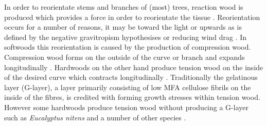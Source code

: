 In order to reorientate stems and branches of (most) trees, reaction wood is
produced which provides a force in order to reorientate the tissue \citep{gardiner2014biology}.
Reorientation occurs for a number of reasons, it may be toward the light or upwards as is defined by the
negative gravitropism hypothesises or reducing wind drag \citep{niklas2012plant, coutts1995wind}. In softwoods this
reorientation is caused by the production of compression wood. Compression wood
forms on the outside of the curve or branch and expands longitudinally \citep{timell1986compression}. Hardwoods
on the other hand produce tension wood on the inside of the desired curve which
contracts longitudinally \citep{gardiner2014biology}. Traditionally the
gelatinous layer (G-layer), a layer primarily consisting of low MFA cellulose
fibrils on the inside of the fibres, is credited with forming growth stresses
within tension wood. However some hardwoods produce tension wood
without producing a G-layer such as \textit{Eucalyptus nitens} \citep{Qiu_2008} and a number of other species \citep{Ruelle_2006}.
